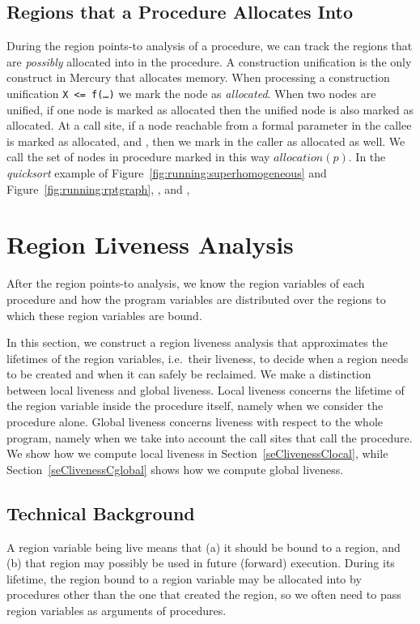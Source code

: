 \documentclass{tlp}
\newcommand{\allocation}[1]{\ensuremath{{allocation}(#1)}}
\newcommand{\code}[1]{{\tt#1}}
\begin{document}
\subsection{Regions that a Procedure Allocates Into}
\label{seCallocCregions}

During the region points-to analysis of a procedure,
we can track the regions
that are \emph{possibly} allocated into in the procedure.
A construction unification is the only construct in Mercury
that allocates memory.
When processing a construction unification \code{X <= f(\ldots)}
we mark the node  as \emph{allocated}.
When two nodes are unified, if one node is marked as allocated
then the unified node is also marked as allocated.
At a call site,
if a node  reachable from a formal parameter in the callee
is marked as allocated,
and ,
then we mark  in the caller as allocated as well.
We call the set of nodes in procedure  marked in this way \allocation{p}.
In the \emph{quicksort} example of
Figure~\ref{fig:running:superhomogeneous}
and Figure~\ref{fig:running:rptgraph},
, and
,

\section{Region Liveness Analysis}
\label{seClra}

After the region points-to analysis,
we know the region variables of each procedure
and how the program variables are distributed
over the regions to which these region variables are bound.

In this section, we construct a region liveness analysis
that approximates the lifetimes of the region variables,
i.e.\ their liveness,
to decide when a region needs to be created
and when it can safely be reclaimed.
We make a distinction between local liveness and global liveness.
Local liveness concerns the lifetime of the region variable
inside the procedure itself, namely when we consider the procedure alone.
Global liveness concerns liveness with respect to the whole program,
namely when we take into account the call sites that call the procedure.
We show how we compute local liveness in Section~\ref{seClivenessClocal},
while Section~\ref{seClivenessCglobal} shows how we compute global liveness.

\subsection{Technical Background}

A region variable being live means that
(a) it should be bound to a region, and
(b) that region may possibly be used in future (forward) execution.
During its lifetime, the region bound to a region variable
may be allocated into by procedures other than the one that created the region,
so we often need to pass region variables as arguments of procedures.
\end{document}
